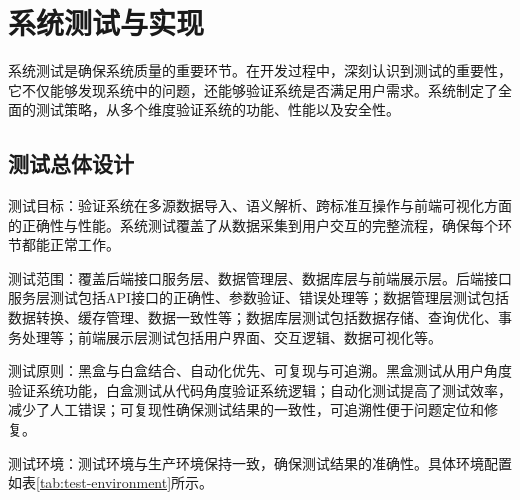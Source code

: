 \section{系统测试与实现}

系统测试是确保系统质量的重要环节。在开发过程中，深刻认识到测试的重要性，它不仅能够发现系统中的问题，还能够验证系统是否满足用户需求。系统制定了全面的测试策略，从多个维度验证系统的功能、性能以及安全性。

\subsection{测试总体设计}

测试目标：验证系统在多源数据导入、语义解析、跨标准互操作与前端可视化方面的正确性与性能。系统测试覆盖了从数据采集到用户交互的完整流程，确保每个环节都能正常工作。

测试范围：覆盖后端接口服务层、数据管理层、数据库层与前端展示层。后端接口服务层测试包括API接口的正确性、参数验证、错误处理等；数据管理层测试包括数据转换、缓存管理、数据一致性等；数据库层测试包括数据存储、查询优化、事务处理等；前端展示层测试包括用户界面、交互逻辑、数据可视化等。

测试原则：黑盒与白盒结合、自动化优先、可复现与可追溯。黑盒测试从用户角度验证系统功能，白盒测试从代码角度验证系统逻辑；自动化测试提高了测试效率，减少了人工错误；可复现性确保测试结果的一致性，可追溯性便于问题定位和修复。

测试环境：测试环境与生产环境保持一致，确保测试结果的准确性。具体环境配置如表\ref{tab:test-environment}所示。

